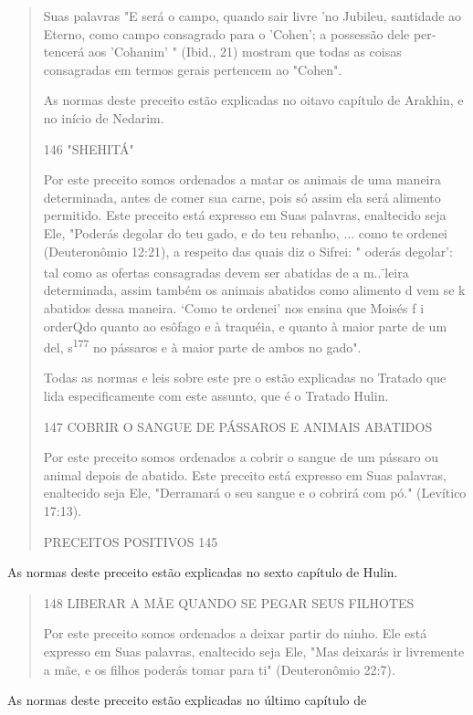 \begin{quote}
Suas palavras "E será o campo, quando sair livre 'no Jubileu, santida­de
ao Eterno, como campo consagrado para o 'Cohen'; a possessão dele
per­tencerá aos 'Cohanim' " (Ibid., 21) mostram que todas as coisas
consagradas em termos gerais pertencem ao "Cohen".

As normas deste preceito estão explicadas no oitavo capítulo de
Arak­hin, e no início de Nedarim.

146 "SHEHITÁ"

Por este preceito somos ordenados a matar os animais de uma ma­neira
determinada, antes de comer sua carne, pois só assim ela será alimento
permitido. Este preceito está expresso em Suas palavras, enaltecido seja
Ele, "Poderás degolar do teu gado, e do teu rebanho, ... como te ordenei
(Deutero­nômio 12:21), a respeito das quais diz o Sifrei: " oderás
degolar': tal como as ofertas consagradas devem ser abatidas de a
m..\textsuperscript{-}leira determinada, assim também os animais
abatidos como alimento d vem se k abatidos dessa maneira. `Como te
ordenei' nos ensina que Moisés f i orderQdo quanto ao esôfago e à
traquéia, e quanto à maior parte de um del, s\textsuperscript{177} no
pássaros e à maior parte de ambos no gado".

Todas as normas e leis sobre este pre o estão explicadas no Trata­do que
lida especificamente com este assunto, que é o Tratado Hulin.

147 COBRIR O SANGUE DE PÁSSAROS E ANIMAIS ABATIDOS

Por este preceito somos ordenados a cobrir o sangue de um pássaro ou
animal depois de abatido. Este preceito está expresso em Suas palavras,
enal­tecido seja Ele, "Derramará o seu sangue e o cobrirá com pó."
(Levítico 17:13).

PRECEITOS POSITIVOS 145
\end{quote}

As normas deste preceito estão explicadas no sexto capítulo de Hulin.

\begin{quote}
148 LIBERAR A MÃE QUANDO SE PEGAR SEUS FILHOTES

Por este preceito somos ordenados a deixar partir do ninho. Ele está
expresso em Suas palavras, enaltecido seja Ele, "Mas deixarás ir
livremente a mãe, e os filhos poderás tomar para ti" (Deuteronômio
22:7).
\end{quote}

As normas deste preceito estão explicadas no último capítulo de

